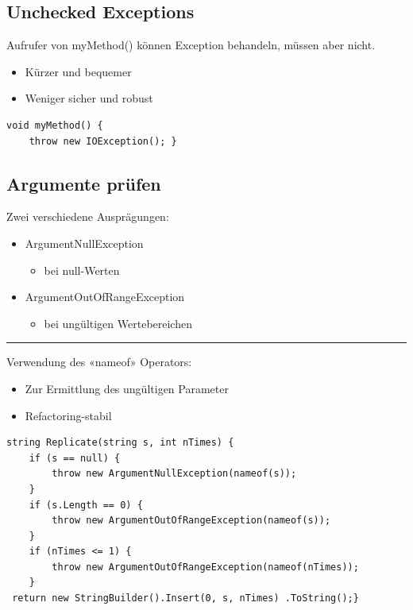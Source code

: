 \subsection{Unchecked Exceptions}
Aufrufer von myMethod() können Exception
behandeln, müssen aber nicht.
\begin{itemize}
    \item Kürzer und bequemer 
    \item Weniger sicher und robust 
\end{itemize}
\begin{lstlisting}
void myMethod() {
    throw new IOException(); }
\end{lstlisting}

\subsection{Argumente prüfen}
Zwei verschiedene Ausprägungen:
\begin{itemize}
    \item ArgumentNullException
    \begin{itemize}
        \item bei null-Werten
    \end{itemize}
    \item ArgumentOutOfRangeException
    \begin{itemize}
        \item bei ungültigen Wertebereichen
    \end{itemize}
\end{itemize}

\hrule

Verwendung des «nameof» Operators:
\begin{itemize}
    \item Zur Ermittlung des ungültigen Parameter
    \item Refactoring-stabil
\end{itemize}

\begin{lstlisting}
string Replicate(string s, int nTimes) {
    if (s == null) {
        throw new ArgumentNullException(nameof(s));
    }
    if (s.Length == 0) {
        throw new ArgumentOutOfRangeException(nameof(s));
    }
    if (nTimes <= 1) {
        throw new ArgumentOutOfRangeException(nameof(nTimes));
    }
 return new StringBuilder().Insert(0, s, nTimes) .ToString();}
\end{lstlisting}

\newpage